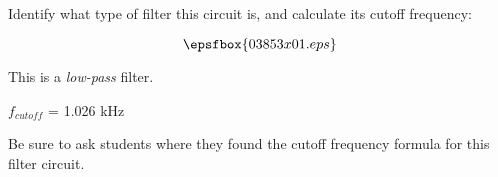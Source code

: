 

Identify what type of filter this circuit is, and calculate its cutoff frequency:

$$\epsfbox{03853x01.eps}$$







This is a {\it low-pass} filter.

\vskip 10pt

$f_{cutoff}$ = 1.026 kHz







Be sure to ask students where they found the cutoff frequency formula for this filter circuit.





